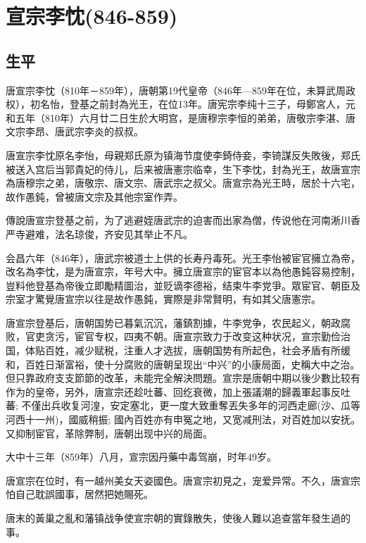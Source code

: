 
\section{宣宗李忱\tiny(846-859)}

\subsection{生平}

唐宣宗李忱（810年－859年），唐朝第19代皇帝（846年—859年在位，未算武周政权），初名怡，登基之前封為光王，在位13年。唐宪宗李纯十三子，母鄭宮人，元和五年（810年）六月廿二日生於大明宫，是唐穆宗李恒的弟弟，唐敬宗李湛、唐文宗李昂、唐武宗李炎的叔叔。

唐宣宗李忱原名李怡，母親郑氏原为镇海节度使李錡侍妾，李锜謀反失敗後，郑氏被送入宫后当郭貴妃的侍儿，后来被唐憲宗临幸，生下李忱，封為光王，故唐宣宗為唐穆宗之弟，唐敬宗、唐文宗、唐武宗之叔父。唐宣宗為光王時，居於十六宅，故作愚鈍，曾被唐文宗及其他宗室作弄。

傳說唐宣宗登基之前，为了逃避姪唐武宗的迫害而出家為僧，传说他在河南淅川香严寺避难，法名琼俊，齐安见其举止不凡。

会昌六年（846年），唐武宗被道士上供的长寿丹毒死。光王李怡被宦官擁立為帝，改名為李忱，是为唐宣宗，年号大中。擁立唐宣宗的宦官本以為他愚鈍容易控制，豈料他登基為帝後立即勵精圖治，並贬谪李德裕，结束牛李党爭。眾宦官、朝臣及宗室才驚覺唐宣宗以往是故作愚鈍，實際是非常賢明，有如其父唐憲宗。

唐宣宗登基后，唐朝国势已暮氣沉沉，藩鎮割據，牛李党争，农民起义，朝政腐败，官吏贪污，宦官专权，四夷不朝。唐宣宗致力于改变这种状况，宣宗勤俭治国，体贴百姓，减少赋税，注重人才选拔，唐朝国势有所起色，社会矛盾有所缓和，百姓日渐富裕，使十分腐败的唐朝呈现出“中兴”的小康局面，史稱大中之治。但只靠政府支支節節的改革，未能完全解決問題。宣宗是唐朝中期以後少數比较有作为的皇帝，另外，唐宣宗还趁吐蕃、回纥衰微，加上張議潮的歸義軍起事反吐蕃; 不僅出兵收复河湟，安定塞北，更一度大致重奪丟失多年的河西走廊(沙、瓜等河西十一州)，國威稍振; 國內百姓亦有申冤之地，又宽减刑法，对百姓加以安抚。又抑制宦官，革除弊制，唐朝出现中兴的局面。

大中十三年（859年）八月，宣宗因丹藥中毒驾崩，时年49岁。

唐宣宗在位时，有一越州美女天姿國色。唐宣宗初見之，宠爱异常。不久，唐宣宗怕自己耽誤國事，居然把她賜死。

唐末的黃巢之亂和藩镇战争使宣宗朝的實錄散失，使後人難以追查當年發生過的事。

